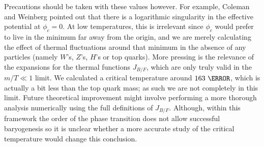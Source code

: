 \documentclass[%
 reprint,
nofootinbib,
 amsmath,amssymb,
 aps,
floatfix,
]{revtex4-1}
\begin{document}
Precautions should be taken with these values however.
For example, Coleman and Weinberg \cite{cw73} pointed out that there is a logarithmic singularity in the effective potential at $\phi_c=0$.
At low temperatures, this is irrelevant since $\phi_c$ would prefer to live in the minimum far away from the origin, and we are merely calculating the effect of thermal fluctuations around that minimum in the absence of any particles (namely $W$'s, $Z$'s, $H$'s or top quarks).
More pressing is the relevance of the expansions for the thermal functions $J_{B/F}$, which are only truly valid in the $m/T\ll1$ limit.
We calculated a critical temperature around $163~\GeV$, which is actually a bit less than the top quark mass; as such we are not completely in this limit.
Future theoretical improvement might involve performing a more thorough analysis numerically using the full definitions of $J_{B/F}$.
Although, within this framework the order of the phase transition does not allow successful baryogenesis so it is unclear whether a more accurate study of the critical temperature would change this conclusion.



\end{document}
